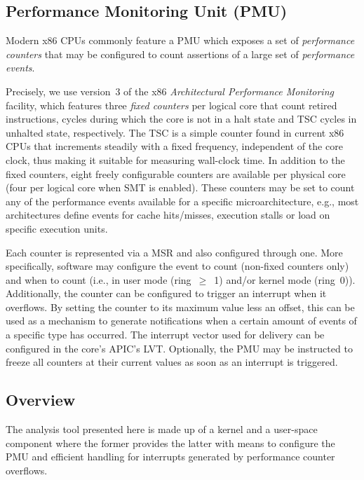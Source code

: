 \subsection{Performance Monitoring Unit (PMU)}
\label{sec:analysis:design:pmu}
Modern x86 \glspl{CPU} commonly feature a \gls{PMU} \cite{intelsdmsysprogguide} which exposes a set of \textit{performance counters} that may be configured to count assertions of a large set of \textit{performance events}.

Precisely, we use version~3 of the x86 \textit{Architectural Performance Monitoring} facility, which features three \textit{fixed counters} per logical core that count retired instructions, cycles during which the core is not in a halt state and \gls{TSC} cycles in unhalted state, respectively. The \gls{TSC} is a simple counter found in current x86 \glspl{CPU} that increments steadily with a fixed frequency, independent of the core clock, thus making it suitable for measuring wall-clock time. In addition to the fixed counters, eight freely configurable counters are available per physical core (four per logical core when \gls{SMT} is enabled). These counters may be set to count any of the performance events available for a specific microarchitecture, e.g., most architectures define events for cache hits/misses, execution stalls or load on specific execution units.

Each counter is represented via a \gls{MSR} and also configured through one. More specifically, software may configure the event to count (non-fixed counters only) and when to count (i.e., in user mode (ring~$\geq$~1) and/or kernel mode (ring~0)). Additionally, the counter can be configured to trigger an interrupt when it overflows. By setting the counter to its maximum value less an offset, this can be used as a mechanism to generate notifications when a certain amount of events of a specific type has occurred. The interrupt vector used for delivery can be configured in the core's \gls{APIC}'s \gls{LVT}. Optionally, the \gls{PMU} may be instructed to freeze all counters at their current values as soon as an interrupt is triggered.

\subsection{Overview}
\label{sec:analysis:design:overview}

The analysis tool presented here is made up of a kernel and a user-space component where the former provides the latter with means to configure the \gls{PMU} and efficient handling for interrupts generated by performance counter overflows.

